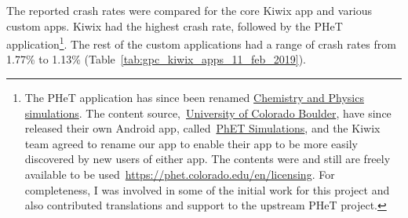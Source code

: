 The reported crash rates were compared for the core Kiwix app and various custom apps. Kiwix had the highest crash rate, followed by the PHeT application\footnote{The PHeT application has since been renamed \href{https://play.google.com/store/apps/details?id=org.kiwix.kiwixcustomphet}{Chemistry and Physics simulations}. The content source,~\href{https://phet.colorado.edu/}{University of Colorado Boulder}, have since released their own Android app, called~\href{https://play.google.com/store/apps/details?id=edu.colorado.phet.androidApp}{PhET Simulations}, and the Kiwix team agreed to rename our app to enable their app to be more easily discovered by new users of either app. The contents were and still are freely available to be used~\url{https://phet.colorado.edu/en/licensing}. For completeness, I was involved in some of the initial work for this project and also contributed translations and support to the upstream PHeT project.}.
%
The rest of the custom applications had a range of crash rates from 1.77\% to 1.13\% (Table~\ref{tab:gpc_kiwix_apps_11_feb_2019}).

